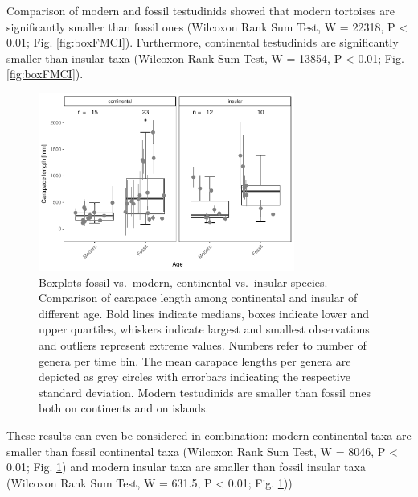 Comparison of modern and fossil testudinids showed that modern tortoises are significantly smaller than fossil ones (Wilcoxon Rank Sum Test, W = 22318, P < 0.01; Fig. \ref{fig:boxFMCI}). Furthermore, continental testudinids are significantly smaller than insular taxa (Wilcoxon Rank Sum Test, W = 13854, P < 0.01; Fig. \ref{fig:boxFMCI}).


\begin{figure}[htbp]
	\centering
	\includegraphics[width=0.75\textwidth]{MA_JJ_files/figure-latex/BPFMCI-1.pdf}
	\caption[Comparison of continental and insular testudinids of modern and fossil age]{Boxplots fossil vs.~modern, continental vs.~insular species.
		Comparison of carapace length among continental and insular \T of different age. Bold lines indicate medians, boxes indicate lower and upper quartiles, whiskers indicate largest and smallest observations and outliers represent extreme values. Numbers refer to number of genera per time bin. The mean carapace lengths per genera are depicted as grey circles with errorbars indicating the respective standard deviation. Modern testudinids are smaller than fossil ones both on continents and on islands.}
	\label{BoxFoMCI}
\end{figure}



These results can even be considered in combination: modern continental taxa are smaller than fossil continental taxa (Wilcoxon Rank Sum Test, W = 8046, P < 0.01; Fig. \ref{BoxFoMCI}) and modern insular taxa are smaller than fossil insular taxa (Wilcoxon Rank Sum Test, W = 631.5, P < 0.01; Fig. \ref{BoxFoMCI}))


